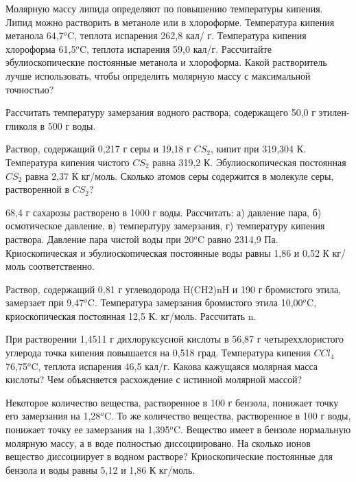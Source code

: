 \begin{Task}
Молярную массу липида определяют по повышению температуры кипения. Липид можно растворить в метаноле или в хлороформе. Температура кипения метанола 64,7$^{o}$C, теплота испарения 262,8 кал/ г. Температура кипения хлороформа 61,5$^{o}$C, теплота испарения 59,0 кал/г. Рассчитайте эбулиоскопические постоянные метанола и хлороформа. Какой растворитель лучше использовать, чтобы определить молярную массу с максимальной точностью?
\end{Task}
\begin{Task}
Рассчитать температуру замерзания водного раствора, содержащего 50,0 г этилен-гликоля в 500 г воды.
\end{Task}
\begin{Task}
Раствор, содержащий 0,217 г серы и 19,18 г $CS_{2}$, кипит при 319,304 К. Температура кипения чистого $CS_{2}$ равна 319,2 К. Эбулиоскопическая постоянная $CS_{2}$ равна 2,37 К кг/моль. Сколько атомов серы содержится в молекуле серы, растворенной в $CS_{2}$?
\end{Task}
\begin{Task}
68,4 г сахарозы растворено в 1000 г воды. Рассчитать: а) давление пара, б) осмотическое давление, в) температуру замерзания, г) температуру кипения раствора. Давление пара чистой воды при 20$^{o}$C равно 2314,9 Па. Криоскопическая и эбулиоскопическая постоянные воды равны 1,86 и 0,52 К кг/моль соответственно.
\end{Task}
\begin{Task}
Раствор, содержащий 0,81 г углеводорода H(CH2)nH и 190 г бромистого этила, замерзает при 9,47$^{o}$C. Температура замерзания бромистого этила 10,00$^{o}$C, криоскопическая постоянная 12,5 К. кг/моль. Рассчитать n.
\end{Task}
\begin{Task}
При растворении 1,4511 г дихлоруксусной кислоты в 56,87 г четыреххлористого углерода точка кипения повышается на 0,518 град. Температура кипения $CCl_{4}$ 76,75$^{o}$C, теплота испарения 46,5 кал/г. Какова кажущаяся молярная масса кислоты? Чем объясняется расхождение с истинной молярной массой?
\end{Task}
\begin{Task}
Некоторое количество вещества, растворенное в 100 г бензола, понижает точку его замерзания на 1,28$^{o}$C. То же количество вещества, растворенное в 100 г воды, понижает точку ее замерзания на 1,395$^{o}$C. Вещество имеет в бензоле нормальную молярную массу, а в воде полностью диссоциировано. На сколько ионов вещество диссоциирует в водном растворе? Криоскопические постоянные для бензола и воды равны 5,12 и 1,86 К кг/моль.
\end{Task}
